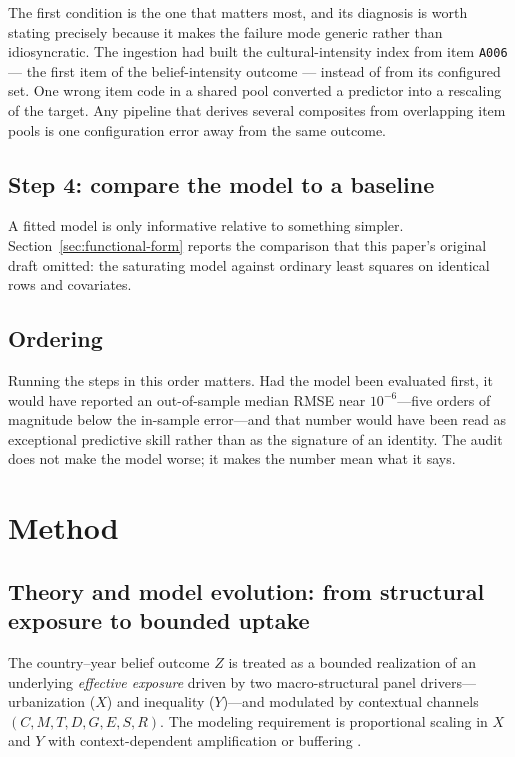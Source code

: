 \documentclass[11pt]{article}
\begin{document}
The first condition is the one that matters most, and its diagnosis is worth stating precisely because it makes the failure mode generic rather than idiosyncratic. The ingestion had built the cultural-intensity index from item \texttt{A006} --- the first item of the belief-intensity outcome --- instead of from its configured set. One wrong item code in a shared pool converted a predictor into a rescaling of the target. Any pipeline that derives several composites from overlapping item pools is one configuration error away from the same outcome.

\subsection*{Step 4: compare the model to a baseline}
A fitted model is only informative relative to something simpler. Section~\ref{sec:functional-form} reports the comparison that this paper's original draft omitted: the saturating model against ordinary least squares on identical rows and covariates.

\subsection*{Ordering}
Running the steps in this order matters. Had the model been evaluated first, it would have reported an out-of-sample median RMSE near $10^{-6}$---five orders of magnitude below the in-sample error---and that number would have been read as exceptional predictive skill rather than as the signature of an identity. The audit does not make the model worse; it makes the number mean what it says.

\section{Method}
\subsection*{Theory and model evolution: from structural exposure to bounded uptake}
The country--year belief outcome $Z$ is treated as a bounded realization of an underlying \emph{effective exposure} driven by two macro-structural panel drivers---urbanization ($X$) and inequality ($Y$)---and modulated by contextual channels $(C,M,T,D,G,E,S,R)$. The modeling requirement is proportional scaling in $X$ and $Y$ with context-dependent amplification or buffering \parencite{Rogers2003Diffusion,Granovetter1978,Centola2010,McAdam1996,Putnam2000}.
\end{document}
